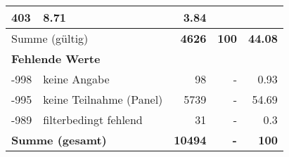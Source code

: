 \begin{longtable}{lXrrr}
       \num{403} &
       \num[round-mode=places,round-precision=2]{8,71} &
         \num[round-mode=places,round-precision=2]{3,84} \\
     \midrule
     \multicolumn{2}{l}{Summe (gültig)} &
       \textbf{\num{4626}} &
     \textbf{100} &
       \textbf{\num[round-mode=places,round-precision=2]{44,08}} \\
     \multicolumn{5}{l}{\textbf{Fehlende Werte}}\\
       -998 &
       keine Angabe &
         \num{98} &
        - &
         \num[round-mode=places,round-precision=2]{0,93} \\
       -995 &
       keine Teilnahme (Panel) &
         \num{5739} &
        - &
         \num[round-mode=places,round-precision=2]{54,69} \\
       -989 &
       filterbedingt fehlend &
         \num{31} &
        - &
         \num[round-mode=places,round-precision=2]{0,3} \\
     \midrule
     \multicolumn{2}{l}{\textbf{Summe (gesamt)}} &
          \textbf{\num{10494}} &
        \textbf{-} &
        \textbf{100} \\
     \bottomrule
     \end{longtable}
     
